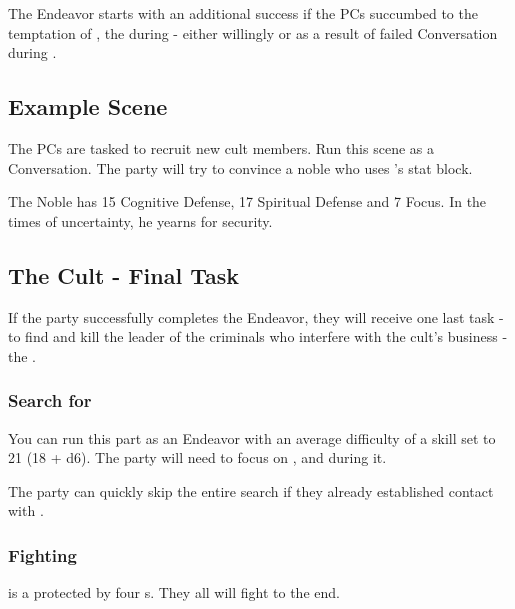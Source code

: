 The Endeavor starts with an additional success if the PCs succumbed to the temptation of \npcHeartRevel{}, the \npcHeartRevel{} during  - either willingly or as a result of failed Conversation during .




\subsection{Example Scene}

The PCs are tasked to recruit new cult members. Run this scene as a Conversation. The party will try to convince a noble who uses \enemyQueensGuardLeader{}'s stat block.

The Noble has 15 Cognitive Defense, 17 Spiritual Defense and 7 Focus. In the times of uncertainty, he yearns for security.



\subsection{The Cult - Final Task}
\label{ssec:theCultOfMomentsFinalTask}

If the party successfully completes the Endeavor, they will receive one last task - to find and kill the leader of the criminals who interfere with the cult's business - the \npcGhostbloodBoss{}.

\subsubsection{Search for \npcGhostbloodBossName{}}

You can run this part as an Endeavor with an average difficulty of a skill set to 21 (18 + d6). The party will need to focus on \skillThievery{}, \skillIntimiation{} and \skillDeception{} during it.

 The party can quickly skip the entire search if they already established contact with \npcGhostbloodBoss{}.

\subsubsection{Fighting \npcGhostbloodBossName{}}

\npcGhostbloodBoss{} is a \enemyGhostbloodBoss{} protected by four \enemyGhostbloodThug{}s. They all will fight to the end.

